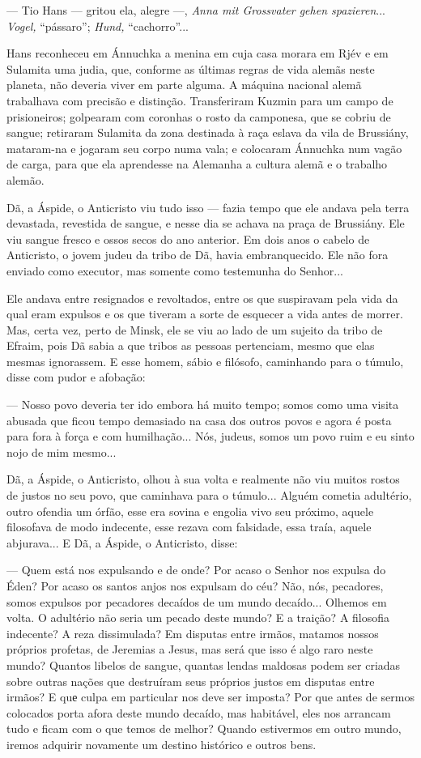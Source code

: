 --- Tio Hans --- gritou ela, alegre ---, \emph{Anna mit Grossvater gehen
spazieren}... \emph{Vogel,} ``pássaro''; \emph{Hund,} ``cachorro''...

Hans reconheceu em Ánnuchka a menina em cuja casa morara em Rjév e em
Sulamita uma judia, que, conforme as últimas regras de vida alemãs neste
planeta, não deveria viver em parte alguma. A máquina nacional alemã
trabalhava com precisão e distinção. Transferiram Kuzmin para um campo
de prisioneiros; golpearam com coronhas o rosto da camponesa, que se
cobriu de sangue; retiraram Sulamita da zona destinada à raça eslava da
vila de Brussiány, mataram-na e jogaram seu corpo numa vala; e colocaram
Ánnuchka num vagão de carga, para que ela aprendesse na Alemanha a
cultura alemã e o trabalho alemão.

Dã, a Áspide, o Anticristo viu tudo isso --- fazia tempo que ele andava
pela terra devastada, revestida de sangue, e nesse dia se achava na
praça de Brussiány. Ele viu sangue fresco e ossos secos do ano anterior.
Em dois anos o cabelo de Anticristo, o jovem judeu da tribo de Dã, havia
embranquecido. Ele não fora enviado como executor, mas somente como
testemunha do Senhor...

Ele andava entre resignados e revoltados, entre os que suspiravam pela
vida da qual eram expulsos e os que tiveram a sorte de esquecer a vida
antes de morrer. Mas, certa vez, perto de Minsk, ele se viu ao lado de
um sujeito da tribo de Efraim, pois Dã sabia a que tribos as pessoas
pertenciam, mesmo que elas mesmas ignorassem. E esse homem, sábio e
filósofo, caminhando para o túmulo, disse com pudor e afobação:

--- Nosso povo deveria ter ido embora há muito tempo; somos como uma
visita abusada que ficou tempo demasiado na casa dos outros povos e
agora é posta para fora à força e com humilhação... Nós, judeus, somos
um povo ruim e eu sinto nojo de mim mesmo...

Dã, a Áspide, o Anticristo, olhou à sua volta e realmente não viu muitos
rostos de justos no seu povo, que caminhava para o túmulo... Alguém
cometia adultério, outro ofendia um órfão, esse era sovina e engolia
vivo seu próximo, aquele filosofava de modo indecente, esse rezava com
falsidade, essa traía, aquele abjurava... E Dã, a Áspide, o Anticristo,
disse:

--- Quem está nos expulsando e de onde? Por acaso o Senhor nos expulsa
do Éden? Por acaso os santos anjos nos expulsam do céu? Não, nós,
pecadores, somos expulsos por pecadores decaídos de um mundo decaído...
Olhemos em volta. O adultério não seria um pecado deste mundo? E a
traição? A filosofia indecente? A reza dissimulada? Em disputas entre
irmãos, matamos nossos próprios profetas, de Jeremias a Jesus, mas será
que isso é algo raro neste mundo? Quantos libelos de sangue, quantas
lendas maldosas podem ser criadas sobre outras nações que destruíram
seus próprios justos em disputas entre irmãos? E quе culpa em particular
nos deve ser imposta? Por que antes de sermos colocados porta afora
deste mundo decaído, mas habitável, eles nos arrancam tudo e ficam com o
que temos de melhor? Quando estivermos em outro mundo, iremos adquirir
novamente um destino histórico e outros bens.

